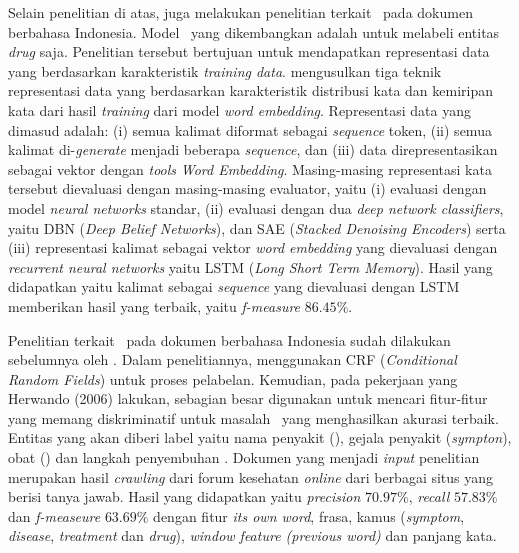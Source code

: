 Selain penelitian di atas, \cite{mujiono2016new} juga melakukan penelitian terkait \mer~pada dokumen berbahasa Indonesia. Model \mer~yang dikembangkan adalah untuk melabeli entitas \textit{drug} saja. Penelitian tersebut bertujuan untuk mendapatkan representasi data yang berdasarkan karakteristik \textit{training data}. \cite{mujiono2016new} mengusulkan tiga teknik representasi data yang berdasarkan karakteristik distribusi kata dan kemiripan kata dari hasil \textit{training} dari model \textit{word embedding}. Representasi data yang dimasud adalah: (i) semua kalimat diformat sebagai \textit{sequence} token, (ii) semua kalimat di-\textit{generate} menjadi beberapa \textit{sequence}, dan (iii) data direpresentasikan sebagai vektor dengan \textit{tools} \textit{Word Embedding}. Masing-masing representasi kata tersebut dievaluasi dengan masing-masing evaluator, yaitu (i) evaluasi dengan model \textit{neural networks} standar, (ii) evaluasi dengan dua \textit{deep network classifiers}, yaitu DBN (\textit{Deep Belief Networks}), dan SAE (\textit{Stacked Denoising Encoders}) serta (iii) representasi kalimat sebagai vektor \textit{word embedding} yang dievaluasi dengan \textit{recurrent neural networks} yaitu LSTM (\textit{Long Short Term Memory}). Hasil yang didapatkan yaitu kalimat sebagai \textit{sequence} yang dievaluasi dengan LSTM memberikan hasil yang terbaik, yaitu \textit{f-measure} $ 86.45\% $.

Penelitian terkait \mer~pada dokumen berbahasa Indonesia sudah dilakukan sebelumnya oleh \cite{skripsiKakRadit}. Dalam penelitiannya, \cite{skripsiKakRadit} menggunakan CRF (\textit{Conditional Random Fields}) untuk proses pelabelan. Kemudian, pada pekerjaan yang Herwando (2006) lakukan, sebagian besar digunakan untuk mencari fitur-fitur yang memang diskriminatif untuk masalah \mer~yang menghasilkan akurasi terbaik. Entitas yang akan diberi label yaitu nama penyakit (\textit{\disease}), gejala penyakit (\textit{sympton}), obat (\textit{\drug}) dan langkah penyembuhan \textit{\treatment}. Dokumen yang menjadi \textit{input} penelitian merupakan hasil \textit{crawling} dari  forum kesehatan \textit{online} dari berbagai situs yang berisi tanya jawab. Hasil yang didapatkan yaitu \textit{precision} $ 70.97\% $, \textit{recall} $ 57.83\% $ dan \textit{f-measeure} $ 63.69\% $ dengan fitur \textit{its own word}, frasa, kamus (\textit{symptom}, \textit{disease}, \textit{treatment} dan \textit{drug}), \textit{window feature (previous word)} dan panjang kata.

